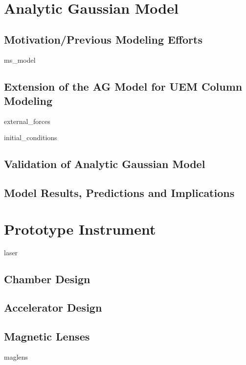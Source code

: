 \documentclass{uicthesi}
\begin{document}
\chapter{Analytic Gaussian Model}

\section{Motivation/Previous Modeling Efforts}

{ms_model}

\section{Extension of the AG Model for UEM Column Modeling}

{external_forces}

{initial_conditions}

\section{Validation of Analytic Gaussian Model}

\section{Model Results, Predictions and Implications} \label{sec:model_results}

\chapter{Prototype Instrument}

{laser}

\section{Chamber Design}

\section{Accelerator Design}

\section{Magnetic Lenses}

{maglens}
\end{document}
